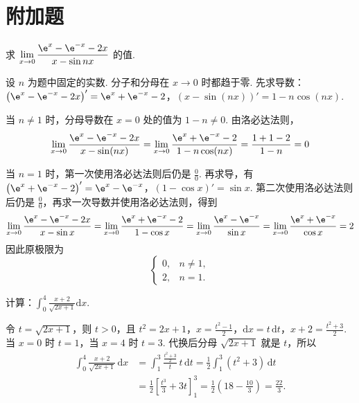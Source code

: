 \section{附加题}


\begin{problem}
求 \(\displaystyle\lim_{x\to0}\frac{\e^x-\e^{-x}-2x}{x-\sin nx}\) 的值.
\end{problem}

\begin{solution}
设 \(n\) 为题中固定的实数. 分子和分母在 \(x\to0\) 时都趋于零. 先求导数：
\(\left(\e^x-\e^{-x}-2x\right)'=\e^x+\e^{-x}-2\)，\(\left(x-\sin(nx)\right)'=1-n\cos(nx)\).

当 \(n\ne1\) 时，分母导数在 \(x=0\) 处的值为 \(1-n\ne0\). 由洛必达法则，
\[
\lim_{x\to0}\frac{\e^x-\e^{-x}-2x}{x-\sin(nx)}
=\lim_{x\to0}\frac{\e^x+\e^{-x}-2}{1-n\cos(nx)}
=\frac{1+1-2}{1-n}=0
\]

当 \(n=1\) 时，第一次使用洛必达法则后仍是 \(\frac{0}{0}\). 再求导，有
\(\left(\e^x+\e^{-x}-2\right)'=\e^x-\e^{-x}\)，\(\left(1-\cos x\right)'=\sin x\).
第二次使用洛必达法则后仍是 \(\frac{0}{0}\)，再求一次导数并使用洛必达法则，得到
\[
\lim_{x\to0}\frac{\e^x-\e^{-x}-2x}{x-\sin x}
=\lim_{x\to0}\frac{\e^x+\e^{-x}-2}{1-\cos x}
=\lim_{x\to0}\frac{\e^x-\e^{-x}}{\sin x}
=\lim_{x\to0}\frac{\e^x+\e^{-x}}{\cos x}=2
\]
因此原极限为
\[
\begin{cases}
0, & n\ne1,\\
2, & n=1.
\end{cases}
\]
\end{solution}

\begin{problem}
计算：\(\int_0^4\frac{x+2}{\sqrt{2x+1}}\mathrm{d}x\).
\end{problem}

\begin{solution}
令 \(t=\sqrt{2x+1}\)，则 \(t>0\)，且
\(t^2=2x+1\)，\(x=\frac{t^2-1}{2}\)，\(\mathrm{d}x=t\,\mathrm{d}t\)，\(x+2=\frac{t^2+3}{2}\).
当 \(x=0\) 时 \(t=1\)，当 \(x=4\) 时 \(t=3\). 代换后分母 \(\sqrt{2x+1}\) 就是 \(t\)，所以
\[
\begin{aligned}
\int_0^4\frac{x+2}{\sqrt{2x+1}}\,\mathrm{d}x
&=\int_1^3\frac{\frac{t^2+3}{2}}{t}\,t\,\mathrm{d}t
=\frac12\int_1^3(t^2+3)\,\mathrm{d}t\\
&=\frac12\left[\frac{t^3}{3}+3t\right]_1^3
=\frac12\left(18-\frac{10}{3}\right)=\frac{22}{3}.
\end{aligned}
\]
\end{solution}
